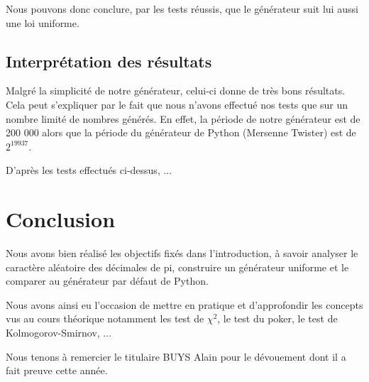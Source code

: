 \documentclass[10pt,a4paper]{article}
\begin{document}
Nous pouvons donc conclure, par les tests réussis, que le générateur suit lui aussi une loi uniforme.
  	
	\newpage
	\subsection{Interprétation des résultats}
	Malgré la simplicité de notre générateur, celui-ci donne de très bons résultats.
	Cela peut s'expliquer par le fait que nous n'avons effectué nos tests que sur un nombre limité de nombres générés. 
	En effet, la période de notre générateur est de 200 000 alors que la période du générateur de Python (Mersenne Twister) est de $2^{19937}$.
	
	D'après les tests effectués ci-dessus, ... %
	
	\newpage
	\section{Conclusion}
	Nous avons bien réalisé les objectifs fixés dans l'introduction, à savoir analyser le caractère aléatoire des décimales de pi, construire un générateur uniforme et le comparer au générateur par défaut de Python.
	
	Nous avons ainsi eu l'occasion de mettre en pratique et d'approfondir les concepts vus au cours théorique notamment les test de $\chi^2$, le test du poker, le test de Kolmogorov-Smirnov, ...
	
	Nous tenons à remercier le titulaire BUYS Alain pour le dévouement dont il a fait preuve cette année.
	
\end{document}
